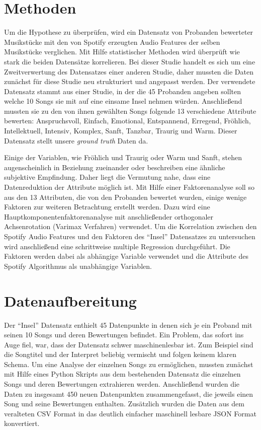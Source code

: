 \section*{Methoden}
\label{sec:Methoden}

Um die Hypothese zu überprüfen,
wird ein Datensatz von Probanden bewerteter Musikstücke mit den von Spotify erzeugten Audio Features der selben Musikstücke verglichen.
Mit Hilfe statistischer Methoden wird überprüft wie stark die beiden Datensätze korrelieren.
Bei dieser Studie handelt es sich um eine Zweitverwertung des Datensatzes einer anderen Studie, daher mussten die Daten zunächst für diese Studie neu strukturiert und angepasst werden.
Der verwendete Datensatz stammt aus einer Studie, in der die 45 Probanden angeben sollten welche 10 Songs sie mit auf eine einsame Insel nehmen würden.
Anschließend mussten sie zu den von ihnen gewählten Songs folgende 13 verschiedene Attribute bewerten: Anspruchsvoll, Einfach, Emotional, Entspannend, Erregend, Fröhlich, Intellektuell, Intensiv, Komplex, Sanft, Tanzbar, Traurig und Warm.
Dieser Datensatz stellt unsere \textit{ground truth} Daten da.

Einige der Variablen, wie Fröhlich und Traurig oder Warm und Sanft, stehen augenscheinlich in Beziehung zueinander oder beschreiben eine ähnliche subjektive Empfindung.
Daher liegt die Vermutung nahe, dass eine Datenreduktion der Attribute möglich ist.
Mit Hilfe einer Faktorenanalyse soll so aus den 13 Attributen, die von den Probanden bewertet wurden, einige wenige Faktoren zur weiteren Betrachtung erstellt werden.
Dazu wird eine Hauptkomponentenfaktorenanalyse mit anschließender orthogonaler Achsenrotation (Varimax Verfahren) verwendet.
Um die Korrelation zwischen den Spotify Audio Features und den Faktoren des "`Insel"' Datensatzes zu untersuchen wird anschließend eine schrittweise multiple Regression durchgeführt.
Die Faktoren werden dabei als abhängige Variable verwendet und die Attribute des Spotify Algorithmus als unabhängige Variablen.



\section*{Datenaufbereitung}
\label{sec:Datenaufbereitung}


Der "`Insel"' Datensatz enthielt 45 Datenpunkte in denen sich je ein Proband mit seinen 10 Songs und deren Bewertungen befindet.
Ein Problem, das sofort ins Auge fiel, war, dass der Datensatz schwer maschinenlesbar ist. 
Zum Beispiel sind die Songtitel und der Interpret beliebig vermischt und folgen keinem klaren Schema.
Um eine Analyse der einzelnen Songs zu ermöglichen, mussten zunächst mit Hilfe eines Python Skripts aus dem bestehenden Datensatz die einzelnen Songs und deren Bewertungen extrahieren werden.
Anschließend wurden die Daten zu insgesamt 450 neuen Datenpunkten zusammengefasst, die jeweils einen Song und seine Bewertungen enthalten.
Zusätzlich wurden die Daten aus dem veralteten CSV Format in das deutlich einfacher maschinell lesbare JSON Format konvertiert.

